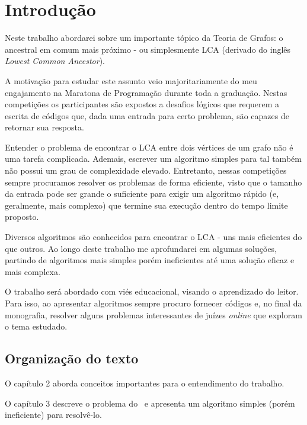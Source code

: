 \chapter{Introdução}
\label{cap:introducao}


Neste trabalho abordarei sobre um importante tópico da Teoria de Grafos: o ancestral 
em comum mais próximo - ou simplesmente LCA (derivado do inglês \emph{Lowest Common 
Ancestor}).

A motivação para estudar este assunto veio majoritariamente do meu engajamento na 
Maratona de Programação durante toda a graduação. Nestas competições os participantes 
são expostos a desafios lógicos que requerem a escrita de códigos que, dada uma 
entrada para certo problema, são capazes de retornar sua resposta.

Entender o problema de encontrar o LCA entre dois vértices de um grafo não é uma 
tarefa complicada. Ademais, escrever um algoritmo simples para tal também não possui 
um grau de complexidade elevado. Entretanto, nessas competições sempre procuramos 
resolver os problemas de forma eficiente, visto que o tamanho da entrada pode ser 
grande o suficiente para exigir um algoritmo rápido (e, geralmente, mais complexo) 
que termine sua execução dentro do tempo limite proposto.

Diversos algoritmos são conhecidos para encontrar o LCA - uns mais eficientes do 
que outros. Ao longo deste trabalho me aprofundarei em algumas soluções, partindo 
de algoritmos mais simples porém ineficientes até uma solução eficaz e mais complexa.

O trabalho será abordado com viés educacional, visando o aprendizado do leitor. 
Para isso, ao apresentar algoritmos sempre procuro fornecer códigos e, no final da
monografia, resolver alguns problemas interessantes de juízes \emph{online} que 
exploram o tema estudado.


\section{Organização do texto}

O capítulo 2 aborda conceitos importantes para o entendimento do trabalho.

\vspace{0.2cm}

O capítulo 3 descreve o problema do \LCA\ e apresenta um algoritmo simples (porém ineficiente) para resolvê-lo.

